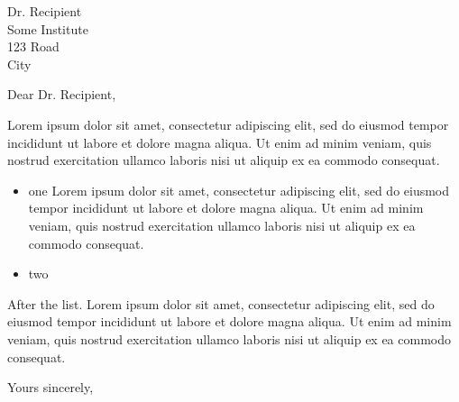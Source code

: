 \documentclass[11pt]{letter}
\date{March 3, 2025}
\begin{document}
\begin{letter}{Dr. Recipient \\ Some Institute \\ 123 Road \\ City}
\opening{Dear Dr. Recipient,}

Lorem ipsum dolor sit amet, consectetur adipiscing elit, sed do eiusmod tempor incididunt ut labore et dolore magna aliqua. Ut enim ad minim veniam, quis nostrud exercitation ullamco laboris nisi ut aliquip ex ea commodo consequat.
\begin{itemize}\item one Lorem ipsum dolor sit amet, consectetur adipiscing elit, sed do eiusmod tempor incididunt ut labore et dolore magna aliqua. Ut enim ad minim veniam, quis nostrud exercitation ullamco laboris nisi ut aliquip ex ea commodo consequat.\item two\end{itemize}
After the list. Lorem ipsum dolor sit amet, consectetur adipiscing elit, sed do eiusmod tempor incididunt ut labore et dolore magna aliqua. Ut enim ad minim veniam, quis nostrud exercitation ullamco laboris nisi ut aliquip ex ea commodo consequat.

\closing{Yours sincerely,}
\end{letter}
\end{document}
